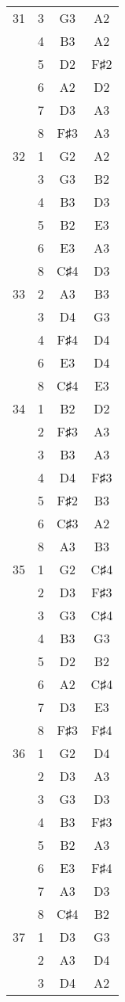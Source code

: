 \documentclass{article}
\begin{document}
\begin{longtable}{|c|c|c|c|}
31 & 3 & G3 & A2 \\ 
  & 4 & B3 & A2 \\ 
  & 5 & D2 & F♯2 \\ 
  & 6 & A2 & D2 \\ 
  & 7 & D3 & A3 \\ 
  & 8 & F♯3 & A3 \\ 
\hline
32 & 1 & G2 & A2 \\ 
  & 3 & G3 & B2 \\ 
  & 4 & B3 & D3 \\ 
  & 5 & B2 & E3 \\ 
  & 6 & E3 & A3 \\ 
  & 8 & C♯4 & D3 \\ 
\hline
33 & 2 & A3 & B3 \\ 
  & 3 & D4 & G3 \\ 
  & 4 & F♯4 & D4 \\ 
  & 6 & E3 & D4 \\ 
  & 8 & C♯4 & E3 \\ 
\hline
34 & 1 & B2 & D2 \\ 
  & 2 & F♯3 & A3 \\ 
  & 3 & B3 & A3 \\ 
  & 4 & D4 & F♯3 \\ 
  & 5 & F♯2 & B3 \\ 
  & 6 & C♯3 & A2 \\ 
  & 8 & A3 & B3 \\ 
\hline
35 & 1 & G2 & C♯4 \\ 
  & 2 & D3 & F♯3 \\ 
  & 3 & G3 & C♯4 \\ 
  & 4 & B3 & G3 \\ 
  & 5 & D2 & B2 \\ 
  & 6 & A2 & C♯4 \\ 
  & 7 & D3 & E3 \\ 
  & 8 & F♯3 & F♯4 \\ 
\hline
36 & 1 & G2 & D4 \\ 
  & 2 & D3 & A3 \\ 
  & 3 & G3 & D3 \\ 
  & 4 & B3 & F♯3 \\ 
  & 5 & B2 & A3 \\ 
  & 6 & E3 & F♯4 \\ 
  & 7 & A3 & D3 \\ 
  & 8 & C♯4 & B2 \\ 
\hline
37 & 1 & D3 & G3 \\ 
  & 2 & A3 & D4 \\ 
  & 3 & D4 & A2 \\ 

\end{longtable}
\end{document}
